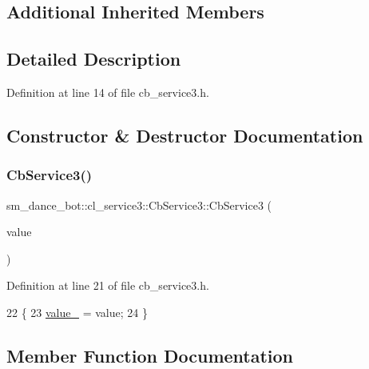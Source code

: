 \subsection*{Additional Inherited Members}


\subsection{Detailed Description}


Definition at line 14 of file cb\+\_\+service3.\+h.



\subsection{Constructor \& Destructor Documentation}
\mbox{\label{classsm__dance__bot_1_1cl__service3_1_1CbService3_a0f03200cabbf54e63efb0a6db4f48ebf}} 
\subsubsection{\texorpdfstring{Cb\+Service3()}{CbService3()}}
{\footnotesize\ttfamily sm\+\_\+dance\+\_\+bot\+::cl\+\_\+service3\+::\+Cb\+Service3\+::\+Cb\+Service3 (\begin{DoxyParamCaption}\item[{\hyperlink{namespacesm__dance__bot_1_1cl__service3_adbcecb84d61edff09f1fb67ef9607ac4}{Service3\+Command}}]{value }\end{DoxyParamCaption})\hspace{0.3cm}{\ttfamily [inline]}}



Definition at line 21 of file cb\+\_\+service3.\+h.


\begin{DoxyCode}
22   \{
23     \hyperlink{classsm__dance__bot_1_1cl__service3_1_1CbService3_a9df8640d9bc42607256ca76df60a5af0}{value\_} = value;
24   \}
\end{DoxyCode}


\subsection{Member Function Documentation}
\mbox{\label{classsm__dance__bot_1_1cl__service3_1_1CbService3_ae9e3796b507ad96cc0890fec0f64a4b7}} 
